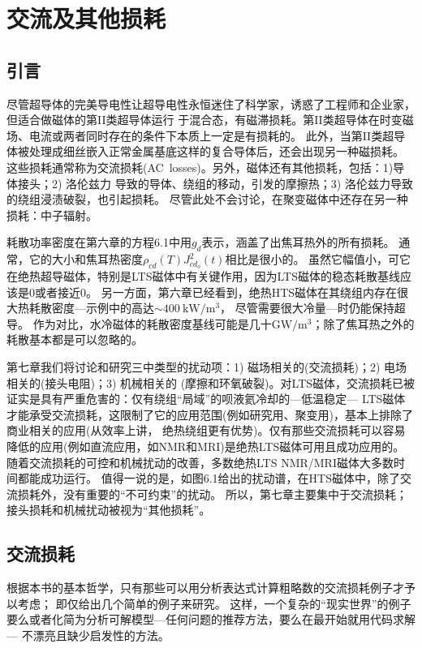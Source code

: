 \chapter{交流及其他损耗}
\section{引言}
尽管超导体的完美导电性让超导电性永恒迷住了科学家，诱惑了工程师和企业家，但适合做磁体的第II类超导体运行
于混合态，有磁滞损耗。第II类超导体在时变磁场、电流或两者同时存在的条件下本质上一定是有损耗的。
此外，当第II类超导体被处理成细丝嵌入正常金属基底这样的复合导体后，还会出现另一种磁损耗。
这些损耗通常称为交流损耗(AC~losses)。另外，磁体还有其他损耗，包括：1)导体接头；2) 洛伦兹力
导致的导体、绕组的移动，引发的摩擦热；3) 洛伦兹力导致的绕组浸渍破裂，也引起损耗。
尽管此处不会讨论，在聚变磁体中还存在另一种损耗：中子辐射。

耗散功率密度在第六章的方程6.1中用$g_d$表示，涵盖了出焦耳热外的所有损耗。
通常，它的大小和焦耳热密度$\rho_{cd}(T)J_{cd_o}^2(t)$相比是很小的。
虽然它幅值小，可它在绝热超导磁体，特别是LTS磁体中有关键作用，因为LTS磁体的稳态耗散基线应该是0或者接近0。
另一方面，第六章已经看到，绝热HTS磁体在其绕组内存在很大热耗散密度---示例中的高达$\sim 400\ \mathrm{kW/m^3}$，
尽管需要很大冷量---时仍能保持超导。
作为对比，水冷磁体的耗散密度基线可能是几十$\mathrm{GW/m^3}$；除了焦耳热之外的耗散基本都是可以忽略的。

第七章我们将讨论和研究三中类型的扰动项：1) 磁场相关的(交流损耗)；2) 电场相关的(接头电阻)；3) 机械相关的
(摩擦和环氧破裂)。对LTS磁体，交流损耗已被证实是具有严重危害的：仅有绕组“局域”的呗液氦冷却的---低温稳定---
LTS磁体才能承受交流损耗，这限制了它的应用范围(例如研究用、聚变用)，基本上排除了商业相关的应用(从效率上讲，
绝热绕组更有优势)。仅有那些交流损耗可以容易降低的应用(例如直流应用，如NMR和MRI)是绝热LTS磁体可用且成功应用的。
随着交流损耗的可控和机械扰动的改善，多数绝热LTS NMR/MRI磁体大多数时间都能成功运行。
值得一说的是，如图6.1给出的扰动谱，在HTS磁体中，除了交流损耗外，没有重要的“不可约束”的扰动。
所以，第七章主要集中于交流损耗；接头损耗和机械扰动被视为“其他损耗”。

\section{交流损耗}
根据本书的基本哲学，只有那些可以用分析表达式计算粗略数的交流损耗例子才予以考虑；
即仅给出几个简单的例子来研究。
这样，一个复杂的“现实世界”的例子要么或者化简为分析可解模型---任何问题的推荐方法，要么在最开始就用代码求解---
不漂亮且缺少启发性的方法。

